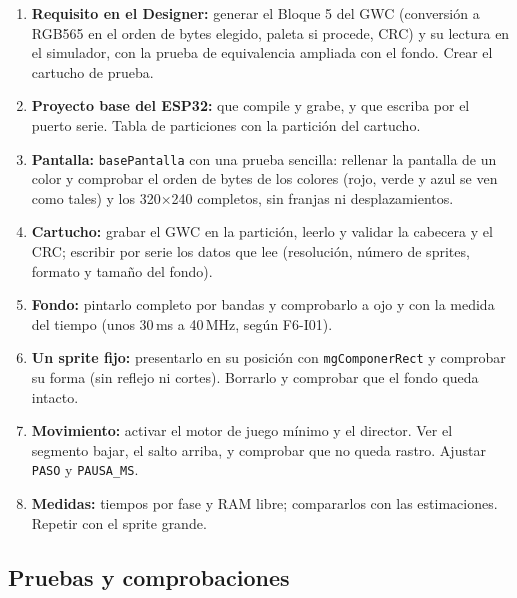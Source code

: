 \begin{enumerate}
	\item \textbf{Requisito en el Designer:} generar el Bloque 5 del GWC (conversión a RGB565 en el orden de bytes elegido, paleta si procede, CRC) y su lectura en el simulador, con la prueba de equivalencia ampliada con el fondo. Crear el cartucho de prueba.
	\item \textbf{Proyecto base del ESP32:} que compile y grabe, y que escriba por el puerto serie. Tabla de particiones con la partición del cartucho.
	\item \textbf{Pantalla:} \texttt{basePantalla} con una prueba sencilla: rellenar la pantalla de un color y comprobar el orden de bytes de los colores (rojo, verde y azul se ven como tales) y los 320$\times$240 completos, sin franjas ni desplazamientos.
	\item \textbf{Cartucho:} grabar el GWC en la partición, leerlo y validar la cabecera y el CRC; escribir por serie los datos que lee (resolución, número de sprites, formato y tamaño del fondo).
	\item \textbf{Fondo:} pintarlo completo por bandas y comprobarlo a ojo y con la medida del tiempo (unos 30\,ms a 40\,MHz, según F6-I01).
	\item \textbf{Un sprite fijo:} presentarlo en su posición con \texttt{mgComponerRect} y comprobar su forma (sin reflejo ni cortes). Borrarlo y comprobar que el fondo queda intacto.
	\item \textbf{Movimiento:} activar el motor de juego mínimo y el director. Ver el segmento bajar, el salto arriba, y comprobar que no queda rastro. Ajustar \texttt{PASO} y \texttt{PAUSA\_MS}.
	\item \textbf{Medidas:} tiempos por fase y RAM libre; compararlos con las estimaciones. Repetir con el sprite grande.
\end{enumerate}

\subsection{Pruebas y comprobaciones}
\label{sec:F6I02Pruebas}

